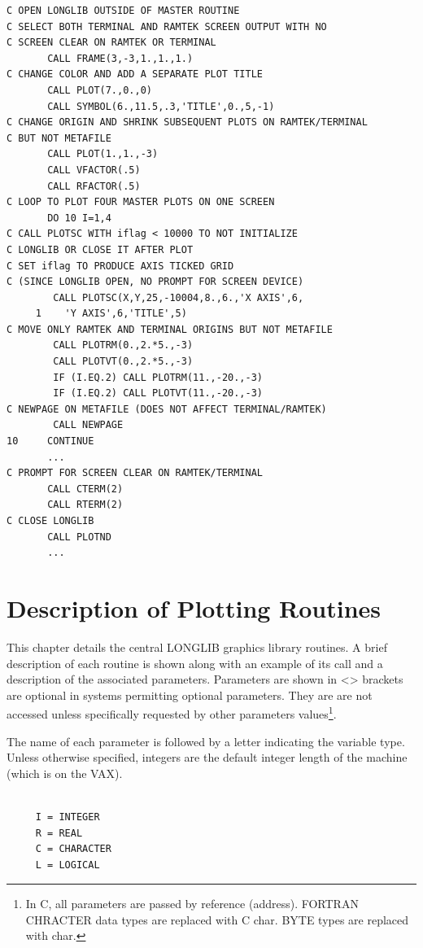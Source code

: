\documentclass[11pt]{report}
\begin{document}
\begin{verbatim}
C OPEN LONGLIB OUTSIDE OF MASTER ROUTINE
C SELECT BOTH TERMINAL AND RAMTEK SCREEN OUTPUT WITH NO
C SCREEN CLEAR ON RAMTEK OR TERMINAL
       CALL FRAME(3,-3,1.,1.,1.)
C CHANGE COLOR AND ADD A SEPARATE PLOT TITLE
       CALL PLOT(7.,0.,0)
       CALL SYMBOL(6.,11.5,.3,'TITLE',0.,5,-1)
C CHANGE ORIGIN AND SHRINK SUBSEQUENT PLOTS ON RAMTEK/TERMINAL
C BUT NOT METAFILE
       CALL PLOT(1.,1.,-3)
       CALL VFACTOR(.5)
       CALL RFACTOR(.5)
C LOOP TO PLOT FOUR MASTER PLOTS ON ONE SCREEN
       DO 10 I=1,4
C CALL PLOTSC WITH iflag < 10000 TO NOT INITIALIZE
C LONGLIB OR CLOSE IT AFTER PLOT
C SET iflag TO PRODUCE AXIS TICKED GRID 
C (SINCE LONGLIB OPEN, NO PROMPT FOR SCREEN DEVICE)
        CALL PLOTSC(X,Y,25,-10004,8.,6.,'X AXIS',6,
     1    'Y AXIS',6,'TITLE',5)
C MOVE ONLY RAMTEK AND TERMINAL ORIGINS BUT NOT METAFILE
        CALL PLOTRM(0.,2.*5.,-3)
        CALL PLOTVT(0.,2.*5.,-3)
        IF (I.EQ.2) CALL PLOTRM(11.,-20.,-3)
        IF (I.EQ.2) CALL PLOTVT(11.,-20.,-3)
C NEWPAGE ON METAFILE (DOES NOT AFFECT TERMINAL/RAMTEK)
        CALL NEWPAGE
10     CONTINUE
       ...
C PROMPT FOR SCREEN CLEAR ON RAMTEK/TERMINAL
       CALL CTERM(2)
       CALL RTERM(2)
C CLOSE LONGLIB
       CALL PLOTND
       ...
\end{verbatim}


\chapter{Description of Plotting Routines}

This chapter details the central LONGLIB graphics library routines.
A brief description of each routine is shown along with an example
of its call and a description of the associated parameters.
Parameters are shown in <> brackets are optional in systems permitting
optional parameters.  They are are not accessed unless specifically
requested by other parameters values\footnote{In C, all parameters are
passed by reference (address).  FORTRAN CHRACTER data types are replaced
with C char.  BYTE types are replaced with char.}.

The name of each parameter is followed by a letter indicating
the variable type.  Unless otherwise specified, integers are the
default integer length of the machine (which is  on the VAX).
\begin{verbatim}

     I = INTEGER 
     R = REAL
     C = CHARACTER 
     L = LOGICAL

\end{verbatim}
\end{document}
